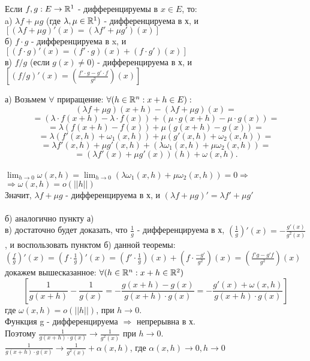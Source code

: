 \begin{teorema}
Если $f,g:E\to\mathbb{R}^1$ - дифференцируемы в $x\in E$, то:
\\
a) $\lambda f+\mu g$ (где $\lambda,\mu\in\mathbb{R}^1)$ - дифференцируема в х, и $[(\lambda f+ \mu g)'(x)=(\lambda f'+\mu g')(x)]$
\\
б) $f\cdot g$ - дифференцируема в x, и 
$[(f\cdot g)'(x)=(f'\cdot g)(x)+(f\cdot g')(x)]$
\\
в) $f/g$ (если $g(x)\ne 0$) - дифференцируема в х, и
\\
$[(f/g)'(x)=(\frac{f'\cdot g - g'\cdot f}{g^2})(x)]$
\end{teorema}

\dokvo
а) Возьмем $\forall$ приращение: $\forall(h\in\mathbb{R}^n:x+h\in E):$
\\
$$(\lambda f+\mu g)(x+h)-(\lambda f+\mu g)(x)=$$
$$=(\lambda\cdot f(x+h)-\lambda\cdot f(x))+(\mu\cdot g(x+h)-\mu\cdot g(x))=$$
$$=\lambda(f(x+h)-f(x))+\mu(g(x+h)-g(x))=$$
$$=\lambda(f'(x,h)+\omega_1(x,h))+\mu(g'(x,h)+\omega_2(x,h))=$$
$$=\lambda f'(x,h)+\mu g'(x,h)+(\lambda\omega_1(x,h)+\mu\omega_2(x,h))=$$
$$=(\lambda f'(x)+\mu g'(x))(h)+\omega(x,h).$$
\\
$\lim_{h\to 0}\omega(x,h)=\lim_{h\to 0}(\lambda\omega_1(x,h)+\mu\omega_2(x,h))=0\Rightarrow$
\\
$\Rightarrow \omega(x,h)=o(||h||)$
\\
Значит, $\lambda f+ \mu g$ - дифференцируема в х, и $(\lambda f+ \mu g)'=\lambda f'+ \mu g'$ 
\\
\dokno
\\
б) аналогично пункту а)
\\
в) достаточно будет доказать, что $\frac{1}{g}$ - дифференцируема в х, $(\frac{1}{g})'(x) = -\frac{g'(x)}{g^2(x)}$, и воспользовать пунктом б) данной теоремы:
\\
$(\frac{f}{g})'(x) = (f\cdot\frac{1}{g})'(x) = (f'\cdot\frac{1}{g})(x)+(f\cdot\frac{-g'}{g^2})(x) = (\frac{f'g-g'f}{g^2})(x)$
\\
докажем вышесказанное:
$\forall(h\in\mathbb{R}^n:x+h\in\mathbb{R}^2)$
\\
$$
[\frac{1}{g(x+h)}-\frac{1}{g(x)}=-\frac{g(x+h)-g(x)}{g(x+h)\cdot g(x)} = -\frac{g'(x)+\omega(x,h)}{g(x+h)\cdot g(x)}]
$$
где $\omega(x,h)=o(||h||)$, при $h\to 0$.
\\
Функция g - дифференцируема $\Rightarrow$ непрерывна в х.
\\
Поэтому $\frac{1}{g(x+h)\cdot g(x)}\to\frac{1}{g^2(x)}$ при $h\to 0$.
\\
$\frac{1}{g(x+h)\cdot g(x)}\to\frac{1}{g^2(x)}+\alpha(x,h)$, где $\alpha(x,h)\to 0, h\to 0$
